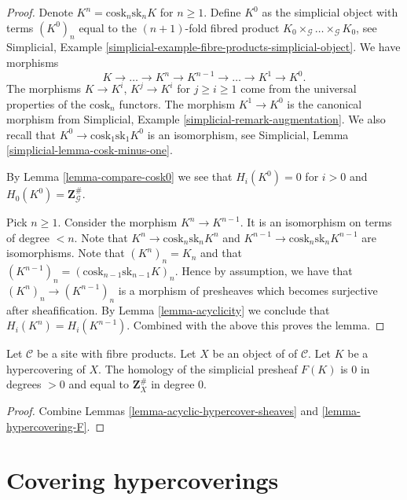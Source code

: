 \begin{proof}
Denote $K^n = \text{cosk}_n \text{sk}_n K$ for $n \geq 1$.
Define $K^0$ as the simplicial object with terms
$(K^0)_n$ equal to the $(n + 1)$-fold fibred product
$K_0 \times_{\mathcal{G}} \ldots \times_{\mathcal{G}} K_0$,
see Simplicial,
Example \ref{simplicial-example-fibre-products-simplicial-object}.
We have morphisms
$$
K \longrightarrow \ldots \to K^n \to K^{n - 1} \to \ldots \to K^1 \to K^0.
$$
The morphisms $K \to K^i$, $K^j \to K^i$ for $j \geq i \geq 1$ come
from the universal properties of the $\text{cosk}_n$ functors.
The morphism $K^1 \to K^0$ is the canonical morphism
from Simplicial, Example \ref{simplicial-remark-augmentation}.
We also recall that $K^0 \to \text{cosk}_1 \text{sk}_1 K^0$
is an isomorphism, see Simplicial, Lemma \ref{simplicial-lemma-cosk-minus-one}.

\medskip\noindent
By Lemma \ref{lemma-compare-cosk0} we see that
$H_i(K^0) = 0$ for $i > 0$ and $H_0(K^0) = \mathbf{Z}_\mathcal{G}^\#$.

\medskip\noindent
Pick $n \geq 1$. Consider the morphism $K^n \to K^{n - 1}$.
It is an isomorphism on terms of degree $< n$.
Note that $K^n \to \text{cosk}_n \text{sk}_n K^n$ and
$K^{n - 1} \to \text{cosk}_n \text{sk}_n K^{n - 1}$
are isomorphisms. Note that $(K^n)_n = K_n$ and
that $(K^{n - 1})_n = (\text{cosk}_{n - 1} \text{sk}_{n - 1} K)_n$.
Hence by assumption, we have that $(K^n)_n \to (K^{n - 1})_n$
is a morphism of presheaves which becomes surjective after
sheafification. By Lemma \ref{lemma-acyclicity} we conclude that
$H_i(K^n) = H_i(K^{n - 1})$.
Combined with the above this proves the lemma.
\end{proof}

\begin{lemma}
\label{lemma-hypercovering-acyclic}
Let $\mathcal{C}$ be a site with fibre products.
Let $X$ be an object of of $\mathcal{C}$.
Let $K$ be a hypercovering of $X$.
The homology of the simplicial presheaf $F(K)$ is
$0$ in degrees $> 0$ and equal to $\mathbf{Z}_X^\#$
in degree $0$.
\end{lemma}

\begin{proof}
Combine Lemmas \ref{lemma-acyclic-hypercover-sheaves}
and \ref{lemma-hypercovering-F}.
\end{proof}







\section{Covering hypercoverings}
\label{section-covering}

